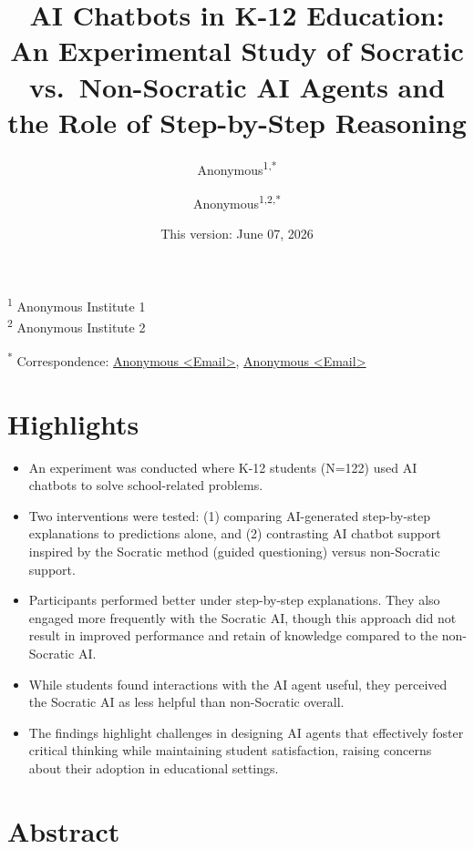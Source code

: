 \documentclass[
  11pt,
]{article}
\title{AI Chatbots in K-12 Education: An Experimental Study of Socratic vs.~Non-Socratic AI Agents and the Role of Step-by-Step Reasoning}
\author{Anonymous\textsuperscript{1,*} \and Anonymous\textsuperscript{1,2,*}}
\date{This version: June 07, 2026}
\begin{document}
\maketitle

\textsuperscript{1} Anonymous Institute 1\\
\textsuperscript{2} Anonymous Institute 2

\textsuperscript{*} Correspondence: \href{mailto:Email}{Anonymous \textless{}Email\textgreater{}}, \href{mailto:Email}{Anonymous \textless{}Email\textgreater{}}

\section*{Highlights}\label{highlights}

\begin{itemize}
\item
  An experiment was conducted where K-12 students (N=122) used AI chatbots to solve school-related problems.
\item
  Two interventions were tested: (1) comparing AI-generated step-by-step explanations to predictions alone, and (2) contrasting AI chatbot support inspired by the Socratic method (guided questioning) versus non-Socratic support.
\item
  Participants performed better under step-by-step explanations. They also engaged more frequently with the Socratic AI, though this approach did not result in improved performance and retain of knowledge compared to the non-Socratic AI.
\item
  While students found interactions with the AI agent useful, they perceived the Socratic AI as less helpful than non-Socratic overall.
\item
  The findings highlight challenges in designing AI agents that effectively foster critical thinking while maintaining student satisfaction, raising concerns about their adoption in educational settings.
\end{itemize}

\section*{Abstract}\label{abstract}
\end{document}
